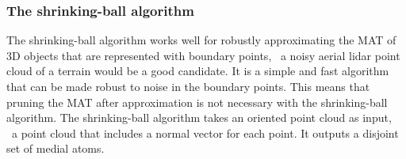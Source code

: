 
\subsubsection{The shrinking-ball algorithm}
The shrinking-ball algorithm works well for robustly approximating the MAT of 3D objects that are represented with boundary points, \eg\ a noisy aerial lidar point cloud of a terrain would be a good candidate.
It is a simple and fast algorithm that can be made robust to noise in the boundary points.
This means that pruning the MAT after approximation is not necessary with the shrinking-ball algorithm.
The shrinking-ball algorithm takes an oriented point cloud as input, \ie\ a point cloud that includes a normal vector for each point. 
It outputs a disjoint set of medial atoms. 

